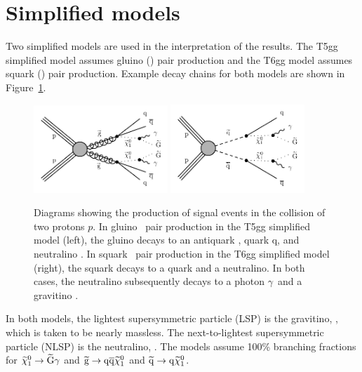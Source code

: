 
\section{Simplified models}
\label{sec:SimplifiedModels}

Two simplified models are used in the interpretation of the results. The T5gg simplified model assumes gluino (\gluino) pair production and the T6gg model assumes squark (\squark) pair production. Example decay chains for both models are shown in Figure~\ref{fig:gluinoSquarkDecay}.

\begin{figure}[htbp]
    \centering
    \includegraphics[width=0.45\textwidth]{Figures/Results/gluinoDecay.pdf}
    \includegraphics[width=0.45\textwidth]{Figures/Results/squarkDecay.pdf}
    \caption[Diagrams showing the production of signal events in the collision
        of two protons.]
    {Diagrams showing the production of signal events in the collision
        of two protons $p$. In gluino
        \gluino~pair production in the T5gg simplified model (left), the gluino
       decays to an antiquark \antiquark, quark q, and neutralino \neutralino. In
        squark \squark~pair production in the T6gg simplified model (right), the
        squark decays to a quark and a neutralino. In both cases, the
        neutralino subsequently decays to a photon $\gamma$~and a gravitino \gravitino.
        }
    \label{fig:gluinoSquarkDecay}
\end{figure}

In both models, the lightest supersymmetric particle (LSP) is the gravitino, \gravitino, which is taken to be nearly massless. The next-to-lightest supersymmetric particle (NLSP) is the neutralino, \neutralino. The models assume 100\% branching fractions for 
$\widetilde{\chi}^{0}_{1}\rightarrow\widetilde{\mathrm{G}}\gamma$ and 
$\widetilde{\mathrm{g}}\rightarrow \mathrm{q} \overline{\mathrm{q}} \widetilde{\chi}^{0}_{1}$ and 
$\widetilde{\mathrm{q}}\rightarrow \mathrm{q} \widetilde{\chi}^{0}_{1}$.

